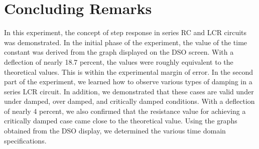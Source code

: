 \documentclass{article}
\begin{document}
\section{Concluding Remarks}
In this experiment, the concept of step response in series RC and LCR circuits was demonstrated. In the initial phase of the experiment, the value of the time constant was derived from the graph displayed on the DSO screen. With a deflection of nearly 18.7 percent, the values were roughly equivalent to the theoretical values. This is within the experimental margin of error. In the second part of the experiment, we learned how to observe various types of damping in a series LCR circuit. In addition, we demonstrated that these cases are valid under under damped, over damped, and critically damped conditions. With a deflection of nearly 4 percent, we also confirmed that the resistance value for achieving a critically damped case came close to the theoretical value. Using the graphs obtained from the DSO display, we determined the various time domain specifications.
\end{document}
